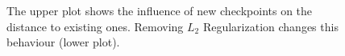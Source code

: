\documentclass[
a4paper, 12pt, %
titlepage, 		 %
twoside,			 %
headsepline,	 %
BCOR5mm,			 %
idxtotoc, bibtotoc]{scrreprt}	%
\begin{document}
\begin{figure}[H]
\begin{center}
        \caption{The upper plot shows the influence of new checkpoints on the distance to existing ones. Removing $L_2$ Regularization changes this behaviour (lower plot).}
    \end{center}
\end{figure}
\end{document}
